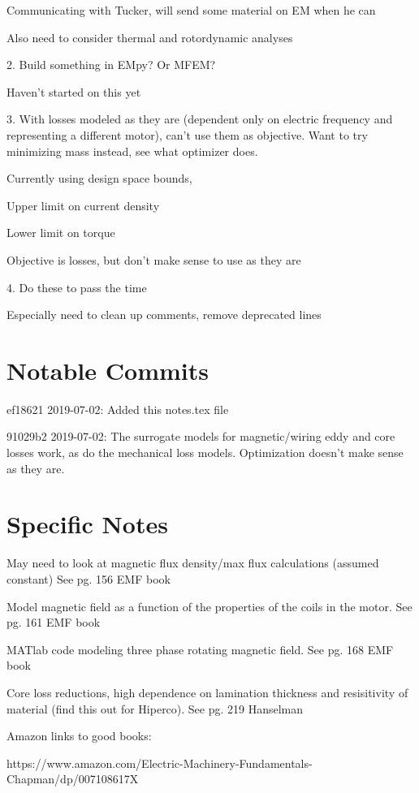 \documentclass[10pt]{article}
\begin{document}
Communicating with Tucker, will send some material on EM when he can

Also need to consider thermal and rotordynamic analyses

2.
Build something in EMpy?
Or MFEM?

Haven't started on this yet


3.
With losses modeled as they are (dependent only on electric frequency and representing a different motor), can't use them as objective.
Want to try minimizing mass instead, see what optimizer does.

Currently using design space bounds,

Upper limit on current density 

Lower limit on torque 

Objective is losses, but don't make sense to use as they are

4. 
Do these to pass the time

Especially need to clean up comments, remove deprecated lines




\section{Notable Commits}

ef18621 2019-07-02: Added this notes.tex file

91029b2 2019-07-02: The surrogate models for magnetic/wiring eddy and core losses work, as do the mechanical loss models. Optimization doesn't make sense as they are.

\section{Specific Notes}

May need to look at magnetic flux density/max flux calculations (assumed constant) See pg. 156 EMF book

Model magnetic field as a function of the properties of the coils in the motor. See pg. 161 EMF book

MATlab code modeling three phase rotating magnetic field. See pg. 168 EMF book

Core loss reductions, high dependence on lamination thickness and resisitivity of material (find this out for Hiperco). See pg. 219 Hanselman

Amazon links to good books:

https://www.amazon.com/Electric-Machinery-Fundamentals-Chapman/dp/007108617X
\end{document}
